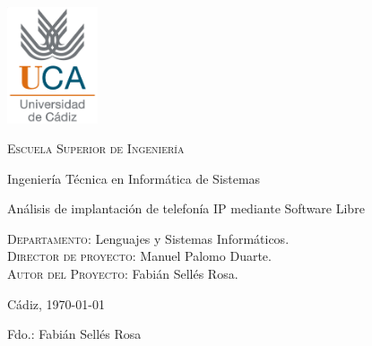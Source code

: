 \thispagestyle{empty}

\includegraphics[width=0.2\textwidth]{images/logouca}

\bigskip
\bigskip
\bigskip
  
  \begin{changemargin}{3em}{3em}

    \begin{center}
      {\Huge \textsc{\nohyphens{Escuela Superior de Ingeniería}}}
      
      \bigskip
      \bigskip
      
      {\huge \nohyphens{Ingeniería Técnica en Informática de Sistemas}}
      
      \bigskip
      \bigskip
      \bigskip
      \bigskip
      
      {\LARGE \nohyphens{Análisis de implantación de telefonía IP mediante Software Libre}}
      
      \bigskip
      \bigskip
      \bigskip
      \bigskip
      
    \end{center}
  \end{changemargin}

  \begin{flushleft}
    \Large

    \textsc{Departamento}: \nohyphens{Lenguajes y Sistemas Informáticos.} \\
    \textsc{Director de proyecto}: \nohyphens{Manuel Palomo Duarte.} \\
    \textsc{Autor del Proyecto}: \nohyphens{Fabián Sellés Rosa}. \\
  \end{flushleft}
  
  \bigskip
  \bigskip
  \bigskip
  
  \begin{flushright}
    \large
    Cádiz, \today
    
    Fdo.: Fabián Sellés Rosa
    
  \end{flushright}

